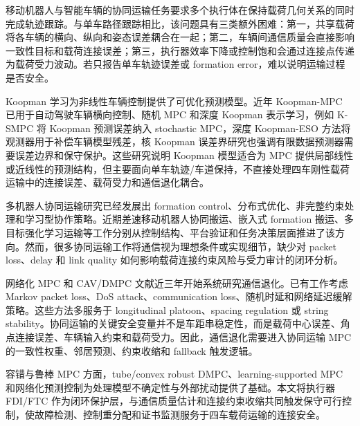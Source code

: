 \documentclass[twocolumn,3p,times,procedia]{elsarticle}
\newif\ifNRReview
\newcommand{\reviewblock}[1]{\ifNRReview\par\smallskip\noindent\begingroup\setlength{\fboxsep}{4pt}\colorbox{yellow!35}{\parbox{0.96\linewidth}{\footnotesize\textbf{当前不足：} #1}}\endgroup\par\smallskip\fi}
\begin{document}
移动机器人与智能车辆的协同运输任务要求多个执行体在保持载荷几何关系的同时完成轨迹跟踪。与单车路径跟踪相比，该问题具有三类额外困难：第一，共享载荷将各车辆的横向、纵向和姿态误差耦合在一起；第二，车辆间通信质量会直接影响一致性目标和载荷连接误差；第三，执行器效率下降或控制饱和会通过连接点传递为载荷受力波动。若只报告单车轨迹误差或 formation error，难以说明运输过程是否安全。

Koopman 学习为非线性车辆控制提供了可优化预测模型。近年 Koopman-MPC 已用于自动驾驶车辆横向控制、随机 MPC 和深度 Koopman 表示学习，例如 K-SMPC 将 Koopman 预测误差纳入 stochastic MPC，深度 Koopman-ESO 方法将观测器用于补偿车辆模型残差，核 Koopman 误差界研究也强调有限数据预测器需要误差边界和保守保护\cite{kim2025ksmpc,chen2024esoDeepKoopman,philipp2023koopmanErrorBounds,cibulka2021koopmanVehicleMpc}。这些研究说明 Koopman 模型适合为 MPC 提供局部线性或近线性的预测结构，但主要面向单车轨迹/车道保持，不直接处理四车刚性载荷运输中的连接误差、载荷受力和通信退化耦合。

多机器人协同运输研究已经发展出 formation control、分布式优化、非完整约束处理和学习型协作策略。近期差速移动机器人协同搬运、嵌入式 formation 搬运、多目标强化学习运输等工作分别从控制结构、平台验证和任务决策层面推进了该方向\cite{cooperativeTransport2024ras,embeddedFormationTransport2024cep,multiObjectiveTransport2024mechatronics,intelligentCollaborativeTransport2024}。然而，很多协同运输工作将通信视为理想条件或实现细节，缺少对 packet loss、delay 和 link quality 如何影响载荷连接约束风险与受力审计的闭环分析。

网络化 MPC 和 CAV/DMPC 文献近三年开始系统研究通信退化。已有工作考虑 Markov packet loss、DoS attack、communication loss、随机时延和网络延迟缓解策略\cite{bian2025markovPacketLossDMPC,dosDMPC2024isa,robustCommunicationLoss2025trb,bao2024robustUkfMpc,networkLatencyCav2024sensors,dai2024networkedPredictiveControl}。这些方法多服务于 longitudinal platoon、spacing regulation 或 string stability。协同运输的关键安全变量并不是车距串稳定性，而是载荷中心误差、角点连接误差、车辆输入约束和载荷受力。因此，通信退化需要进入协同运输 MPC 的一致性权重、邻居预测、约束收缩和 fallback 触发逻辑。

容错与鲁棒 MPC 方面，tube/convex robust DMPC、learning-supported MPC 和网络化预测控制为处理模型不确定性与外部扰动提供了基础\cite{convexRobustDMPC2025ejc,gasparino2023nnMpcUncertainty,dai2024networkedPredictiveControl}。本文将执行器 FDI/FTC 作为闭环保护层，与通信质量估计和连接约束收缩共同触发保守可行控制，使故障检测、控制重分配和证书监测服务于四车载荷运输的连接安全。
\reviewblock{FDI/FTC 近三年直接对标文献和多 seed 检测延迟统计仍需扩充；当前主文中应把它写作闭环保护增强模块，而不写作独立超越 FTC 文献的理论贡献。}
\end{document}
